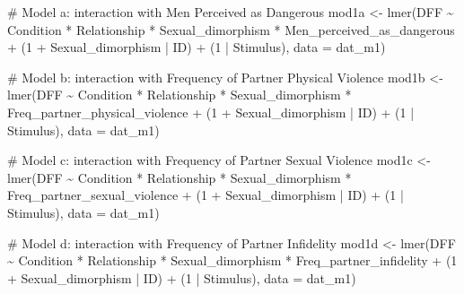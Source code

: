 \documentclass[
  bookmarksnumbered]{article}
\newenvironment{Shaded}{\begin{snugshade}}{\end{snugshade}}
\newcommand{\AttributeTok}[1]{\textcolor[rgb]{0.80,0.80,0.80}{#1}}
\newcommand{\CommentTok}[1]{\textcolor[rgb]{0.50,0.62,0.50}{#1}}
\newcommand{\DecValTok}[1]{\textcolor[rgb]{0.86,0.86,0.80}{#1}}
\newcommand{\FunctionTok}[1]{\textcolor[rgb]{0.94,0.94,0.56}{#1}}
\newcommand{\NormalTok}[1]{\textcolor[rgb]{0.80,0.80,0.80}{#1}}
\newcommand{\OtherTok}[1]{\textcolor[rgb]{0.94,0.94,0.56}{#1}}
\newcommand{\SpecialCharTok}[1]{\textcolor[rgb]{0.86,0.64,0.64}{#1}}
\begin{document}
\begin{Shaded}
\begin{Highlighting}[]
\CommentTok{\# Model a: interaction with Men Perceived as Dangerous}
\NormalTok{mod1a }\OtherTok{\textless{}{-}} \FunctionTok{lmer}\NormalTok{(DFF }\SpecialCharTok{\textasciitilde{}}
\NormalTok{                Condition }\SpecialCharTok{*}\NormalTok{ Relationship }\SpecialCharTok{*}\NormalTok{ Sexual\_dimorphism }\SpecialCharTok{*}\NormalTok{ Men\_perceived\_as\_dangerous }\SpecialCharTok{+}
\NormalTok{                (}\DecValTok{1} \SpecialCharTok{+}\NormalTok{ Sexual\_dimorphism }\SpecialCharTok{|}\NormalTok{ ID) }\SpecialCharTok{+}\NormalTok{ (}\DecValTok{1} \SpecialCharTok{|}\NormalTok{ Stimulus), }
              \AttributeTok{data =}\NormalTok{ dat\_m1)}

\CommentTok{\# Model b: interaction with Frequency of Partner Physical Violence}
\NormalTok{mod1b }\OtherTok{\textless{}{-}} \FunctionTok{lmer}\NormalTok{(DFF }\SpecialCharTok{\textasciitilde{}}
\NormalTok{                Condition }\SpecialCharTok{*}\NormalTok{ Relationship }\SpecialCharTok{*}\NormalTok{ Sexual\_dimorphism }\SpecialCharTok{*}\NormalTok{ Freq\_partner\_physical\_violence }\SpecialCharTok{+}
\NormalTok{                (}\DecValTok{1} \SpecialCharTok{+}\NormalTok{ Sexual\_dimorphism }\SpecialCharTok{|}\NormalTok{ ID) }\SpecialCharTok{+}\NormalTok{ (}\DecValTok{1} \SpecialCharTok{|}\NormalTok{ Stimulus), }
              \AttributeTok{data =}\NormalTok{ dat\_m1)}

\CommentTok{\# Model c: interaction with Frequency of Partner Sexual Violence}
\NormalTok{mod1c }\OtherTok{\textless{}{-}} \FunctionTok{lmer}\NormalTok{(DFF }\SpecialCharTok{\textasciitilde{}}
\NormalTok{                Condition }\SpecialCharTok{*}\NormalTok{ Relationship }\SpecialCharTok{*}\NormalTok{ Sexual\_dimorphism }\SpecialCharTok{*}\NormalTok{ Freq\_partner\_sexual\_violence }\SpecialCharTok{+}
\NormalTok{                (}\DecValTok{1} \SpecialCharTok{+}\NormalTok{ Sexual\_dimorphism }\SpecialCharTok{|}\NormalTok{ ID) }\SpecialCharTok{+}\NormalTok{ (}\DecValTok{1} \SpecialCharTok{|}\NormalTok{ Stimulus), }
              \AttributeTok{data =}\NormalTok{ dat\_m1)}

\CommentTok{\# Model d: interaction with Frequency of Partner Infidelity}
\NormalTok{mod1d }\OtherTok{\textless{}{-}} \FunctionTok{lmer}\NormalTok{(DFF }\SpecialCharTok{\textasciitilde{}}
\NormalTok{                Condition }\SpecialCharTok{*}\NormalTok{ Relationship }\SpecialCharTok{*}\NormalTok{ Sexual\_dimorphism }\SpecialCharTok{*}\NormalTok{ Freq\_partner\_infidelity }\SpecialCharTok{+}
\NormalTok{                (}\DecValTok{1} \SpecialCharTok{+}\NormalTok{ Sexual\_dimorphism }\SpecialCharTok{|}\NormalTok{ ID) }\SpecialCharTok{+}\NormalTok{ (}\DecValTok{1} \SpecialCharTok{|}\NormalTok{ Stimulus), }
              \AttributeTok{data =}\NormalTok{ dat\_m1)}


\end{Highlighting}
\end{Shaded}
\end{document}
